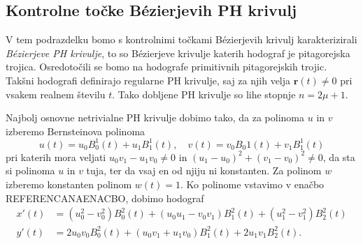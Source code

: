 \documentclass[isrm2, tisk]{fmfdelo}
\begin{document}
    \subsection{Kontrolne točke Bézierjevih PH krivulj}
    V tem podrazdelku bomo s kontrolnimi točkami Bézierjevih krivulj karakterizirali \textit{Bézierjeve PH krivulje}, to so Bézierjeve krivulje katerih hodograf je pitagorejska trojica.
    Osredotočili se bomo na hodografe primitivnih pitagorejskih trojic.
    Takšni hodografi definirajo regularne PH krivulje, saj za njih velja $\mathbf{r}(t) \neq 0$ pri vsakem realnem številu $t$.
    Tako dobljene PH krivulje so lihe stopnje $n=2\mu+1$.

    Najbolj osnovne netrivialne PH krivulje dobimo tako, da za polinoma $u$ in $v$ izberemo Bernsteinova polinoma
    \[u(t)=u_0B_{0}^{1}(t)+u_1B_{1}^{1}(t),\quad v(t)=v_0B_{0}{1}(t)+v_1B_{1}^{1}(t)\]
    pri katerih mora veljati $u_0v_1-u_1v_0\neq 0$ in $(u_1-u_0)^2+(v_1-v_0)^2\neq 0$, da sta si polinoma $u$ in $v$ tuja, ter da vsaj en od njiju ni konstanten.
    Za polinom $w$ izberemo konstanten polinom $w(t)=1$.
    Ko polinome vstavimo v enačbo REFERENCANAENACBO, dobimo hodograf
    \begin{align*}
        x'(t) &=(u_0^2-v_0^2)B_{0}^{2}(t)+(u_0u_1-v_0v_1)B_{1}^{2}(t) + (u_1^2-v_1^2)B_{2}^{2}(t)\\
        y'(t) &= 2u_0 v_0 B_{0}^{2}(t)+(u_0v_1+u_1v_0)B_{1}^{2}(t)+2u_1 v_1 B_{2}^{2}(t).
    \end{align*}
\end{document}
